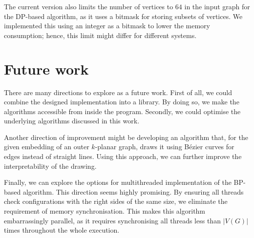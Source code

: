 The current version also limits the number of vertices to \(64\) in the input graph for the DP-based algorithm, as it uses a bitmask for storing subsets of vertices. We implemented this using an integer as a bitmask to lower the memory consumption; hence, this limit might differ for different systems.

\section{Future work}

There are many directions to explore as a future work. First of all, we could combine the designed implementation into a library. By doing so, we make the algorithms accessible from inside the program. Secondly, we could optimise the underlying algorithms discussed in this work.

Another direction of improvement might be developing an algorithm that, for the given embedding of an outer \(k\)-planar graph, draws it using Bézier curves for edges instead of straight lines. Using this approach, we can further improve the interpretability of the drawing.

Finally, we can explore the options for multithreaded implementation of the BP-based algorithm. This direction seems highly promising. By ensuring all threads check configurations with the right sides of the same size, we eliminate the requirement of memory synchronisation. This makes this algorithm embarrassingly parallel, as it requires synchronising all threads less than \(|V(G)|\) times throughout the whole execution.

